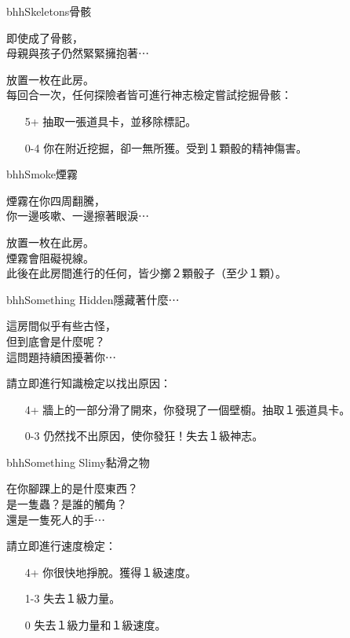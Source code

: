 \linebreak[0]%
\begin{EventCard}{bhh}{Skeletons}{骨骸}
  \begin{CardStory}
    即使成了骨骸，\\
    母親與孩子仍然緊緊擁抱著⋯
  \end{CardStory}
  放置一枚在此房。\\[0.5em]
  每回合一次，任何探險者皆可進行神志檢定嘗試挖掘骨骸：
  \begin{itemize}
    \item[5+] 抽取一張道具卡，並移除標記。
    \item[0-4] 你在附近挖掘，卻一無所獲。受到１顆骰的精神傷害。
  \end{itemize}
\end{EventCard}%
\linebreak[0]%
\begin{EventCard}{bhh}{Smoke}{煙霧}
  \begin{CardStory}
    煙霧在你四周翻騰，\\
    你一邊咳嗽、一邊擦著眼淚⋯
  \end{CardStory}
  放置一枚在此房。\\[0.5em]
  煙霧會阻礙視線。\\[0.5em]
  此後在此房間進行的任何，皆少擲２顆骰子（至少１顆）。\\[0.5em]
\end{EventCard}%
\linebreak[0]%
\begin{EventCard}{bhh}{Something Hidden}{隱藏著什麼⋯}
  \begin{CardStory}
    這房間似乎有些古怪，\\
    但到底會是什麼呢？\\
    這問題持續困擾著你⋯
  \end{CardStory}
  請立即進行知識檢定以找出原因：
  \begin{itemize}
    \item[4+] 牆上的一部分滑了開來，你發現了一個壁櫥。抽取１張道具卡。
    \item[0-3] 仍然找不出原因，使你發狂！失去１級神志。
  \end{itemize}
\end{EventCard}%
\linebreak[0]%
\begin{EventCard}{bhh}{Something Slimy}{黏滑之物}
  \begin{CardStory}
    在你腳踝上的是什麼東西？\\
    是一隻蟲？是誰的觸角？\\
    還是一隻死人的手⋯
  \end{CardStory}
  請立即進行速度檢定：
  \begin{itemize}
    \item[4+] 你很快地掙脫。獲得１級速度。
    \item[1-3] 失去１級力量。
    \item[0] 失去１級力量和１級速度。
  \end{itemize}
\end{EventCard}%
